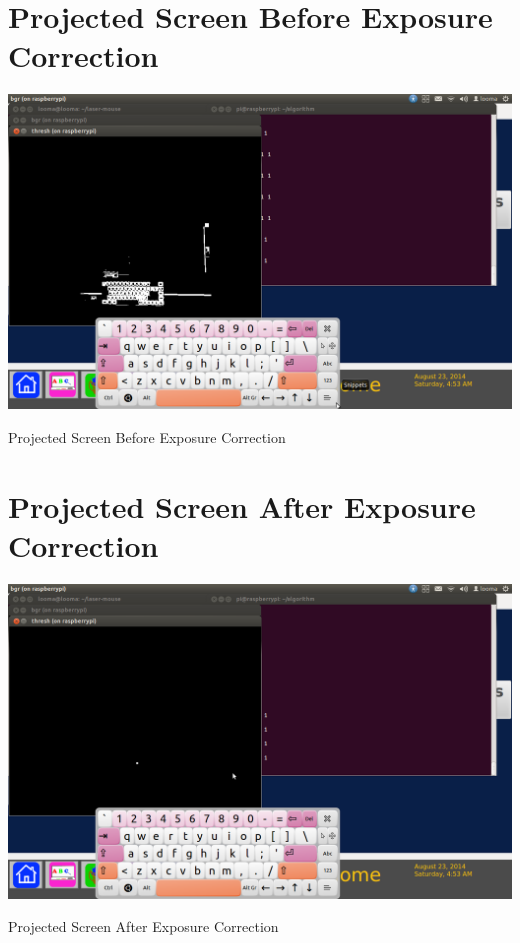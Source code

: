 \documentclass[12pt, a4paper]{article}
\begin{document}
\begin{appendices}
\section{Projected Screen Before Exposure Correction}
\begin{appendixfig}
\includegraphics[scale=0.30]{projector.png}
\caption{Projected Screen Before Exposure Correction}
\label{}
\end{appendixfig}
\newpage

\section{Projected Screen After Exposure Correction}
\begin{appendixfig}
\includegraphics[scale=0.30]{projectorwithout.png}
\caption{Projected Screen After Exposure Correction}
\label{}
\end{appendixfig}
\newpage

\end{appendices}
\end{document}
